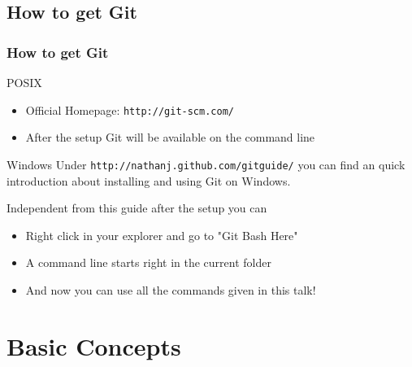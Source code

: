 \documentclass{beamer}
\begin{document}
\subsection{How to get Git}
\frame
{
  \frametitle{How to get Git}
  \begin{block}{POSIX}
    \begin{itemize}
      \item Official Homepage: \texttt{http://git-scm.com/}
      \item After the setup Git will be available on the command line
    \end{itemize}

  \end{block}
  \begin{block}{Windows}
    Under \texttt{http://nathanj.github.com/gitguide/} you can find an quick introduction about installing and using Git on Windows.\smallskip

    Independent from this guide after the setup you can 
    \begin{itemize}
      \item Right click in your explorer and go to "Git Bash Here"
      \item A command line starts right in the current folder
      \item And now you can use all the commands given in this talk!
    \end{itemize}
  \end{block}
}
\section{Basic Concepts}
\end{document}
